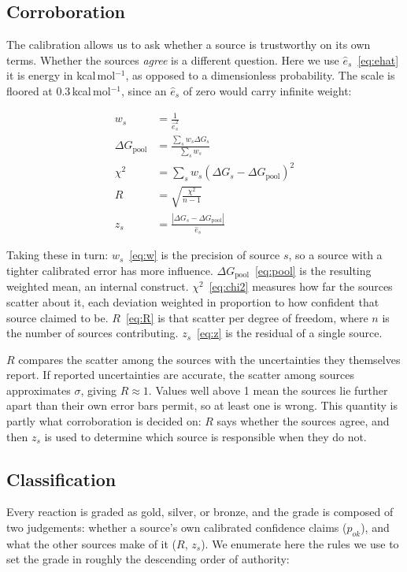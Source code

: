 \subsection{Corroboration} The calibration allows us to ask whether a source is trustworthy on its own terms. Whether the sources \emph{agree} is a different question. Here we use $\hat{e}_s$~\eqref{eq:ehat} it is energy in kcal\,mol$^{-1}$, as opposed to a dimensionless probability. The scale is floored at 0.3\,kcal\,mol$^{-1}$, since an $\hat{e}_s$ of zero would carry infinite weight:

\begin{align}
  w_s &= \frac{1}{\hat{e}_s^{2}} \label{eq:w} \\[2pt]
  \Delta G_{\text{pool}} &= \frac{\sum_s w_s \Delta G_s}{\sum_s w_s} \label{eq:pool} \\[2pt]
  \chi^{2} &= \sum_s w_s \left(\Delta G_s - \Delta G_{\text{pool}}\right)^{2} \label{eq:chi2} \\[2pt]
  R &= \sqrt{\frac{\chi^{2}}{n-1}} \label{eq:R} \\[2pt]
  z_s &= \frac{\left|\Delta G_s - \Delta G_{\text{pool}}\right|}{\hat{e}_s} \label{eq:z}
\end{align}

Taking these in turn: $w_s$~\eqref{eq:w} is the precision of source $s$, so a source with a tighter calibrated error has more influence. $\Delta G_{\text{pool}}$~\eqref{eq:pool} is the resulting weighted mean, an internal construct. $\chi^{2}$~\eqref{eq:chi2} measures how far the sources scatter about it, each deviation weighted in proportion to how confident that source claimed to be. $R$~\eqref{eq:R} is that scatter per degree of freedom, where $n$ is the number of sources contributing. $z_s$~\eqref{eq:z} is the residual of a single source.

$R$ compares the scatter among the sources with the uncertainties they themselves report. If reported uncertainties are accurate, the scatter among sources approximates $\sigma$, giving $R \approx 1$. Values well above 1 mean the sources lie further apart than their own error bars permit, so at least one is wrong. This quantity is partly what corroboration is decided on: $R$ says whether the sources agree, and then $z_s$ is used to determine which source is responsible when they do not.

\subsection{Classification} Every reaction is graded as gold, silver, or bronze, and the grade is composed of two judgements: whether a source's own calibrated confidence claims ($p_{ok}$), and what the other sources make of it ($R$, $z_s$). We enumerate here the rules we use to set the grade in roughly the descending order of authority: 

